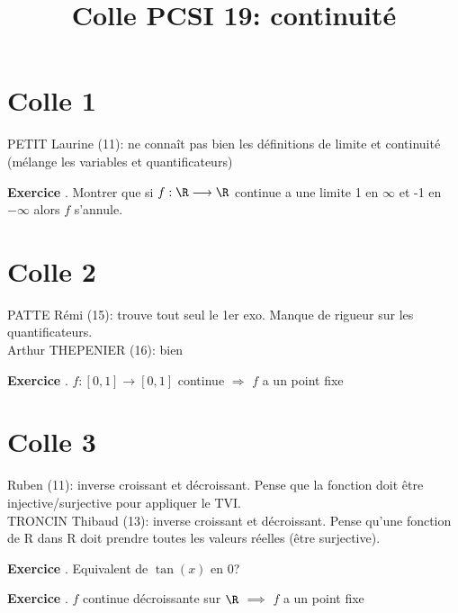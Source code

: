 \documentclass[10pt,a4paper]{article}
\title{Colle PCSI 19: continuité}
\newcounter{question}
\newcounter{exo}
\newenvironment{exo}{\vspace{0.5cm}\setcounter{question}{0}\addtocounter{exo}{1} \noindent \textbf{Exercice \theexo}. \normalsize }{\par}
\begin{document}
	\maketitle
\section*{Colle 1}
\setcounter{exo}{0}
	PETIT Laurine (11): ne connaît pas bien les définitions de limite et continuité (mélange les variables et quantificateurs)\\
		
	\begin{exo}
		Montrer que si $f : \R \longrightarrow \R$ continue a une limite 1 en $\infty$ et -1 en $-\infty$ alors $f$ s'annule.
 	\end{exo}

	\section*{Colle 2}
	PATTE Rémi (15): trouve tout seul le 1er exo. Manque de rigueur sur les quantificateurs. \\
	Arthur THEPENIER (16): bien\\
	
	\begin{exo}
		$f : [0, 1] \rightarrow [0, 1]$ continue $\Longrightarrow$ $f$ a un point fixe
	\end{exo}

	\section*{Colle 3}
	\setcounter{exo}{0}
	Ruben (11): inverse croissant et décroissant. Pense que la fonction doit être injective/surjective pour appliquer le TVI.\\
	TRONCIN Thibaud (13): inverse croissant et décroissant. Pense qu'une fonction de R dans R doit prendre toutes les valeurs réelles (être surjective).\\
	
	\begin{exo}
		Equivalent de $\tan(x)$ en 0?
	\end{exo}
	
	\begin{exo}
		$f$ continue décroissante sur $\R$ $\implies$ $f$ a un point fixe
	\end{exo}
	
\end{document}
